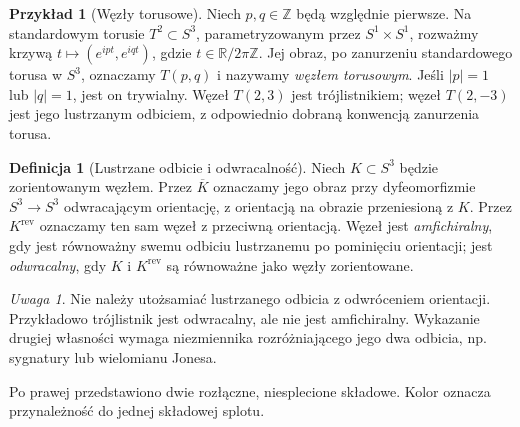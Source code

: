 \documentclass[11pt,a4paper]{report}
\numberwithin{equation}{section}
\theoremstyle{plain}
\theoremstyle{definition}
\newtheorem{definicja}[twierdzenie]{Definicja}
\newtheorem{przyklad}[twierdzenie]{Przykład}
\theoremstyle{remark}
\newtheorem{uwaga}[twierdzenie]{Uwaga}
\begin{document}
\begin{przyklad}[Węzły torusowe]
Niech $p,q\in\mathbb Z$ będą względnie pierwsze. Na standardowym
torusie $T^2\subset S^3$, parametryzowanym przez
$S^1\times S^1$, rozważmy krzywą
$t\mapsto(e^{ipt},e^{iqt})$, gdzie $t\in\mathbb R/2\pi\mathbb Z$.
Jej obraz, po zanurzeniu standardowego torusa w $S^3$, oznaczamy
$T(p,q)$ i nazywamy \emph{węzłem torusowym}. Jeśli $|p|=1$
lub $|q|=1$, jest on trywialny. Węzeł $T(2,3)$ jest trójlistnikiem;
węzeł $T(2,-3)$ jest jego lustrzanym odbiciem, z odpowiednio
dobraną konwencją zanurzenia torusa.
\end{przyklad}

\begin{definicja}[Lustrzane odbicie i odwracalność]
Niech $K\subset S^3$ będzie zorientowanym węzłem.
Przez $\overline K$ oznaczamy jego obraz przy dyfeomorfizmie
$S^3\to S^3$ odwracającym orientację, z orientacją na obrazie
przeniesioną z $K$. Przez $K^{\mathrm{rev}}$ oznaczamy ten sam
węzeł z przeciwną orientacją. Węzeł jest \emph{amfichiralny},
gdy jest równoważny swemu odbiciu lustrzanemu po pominięciu
orientacji; jest \emph{odwracalny}, gdy $K$ i $K^{\mathrm{rev}}$
są równoważne jako węzły zorientowane.
\end{definicja}

\begin{uwaga}
Nie należy utożsamiać lustrzanego odbicia z odwróceniem orientacji.
Przykładowo trójlistnik jest odwracalny, ale nie jest amfichiralny.
Wykazanie drugiej własności wymaga niezmiennika rozróżniającego
jego dwa odbicia, np. sygnatury lub wielomianu Jonesa.
\end{uwaga}


\begin{center}
\end{center}
\noindent Po prawej przedstawiono dwie rozłączne, niesplecione składowe.
Kolor oznacza przynależność do jednej składowej splotu.
\end{document}
